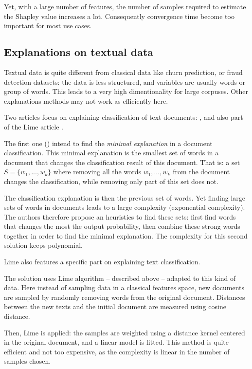 \documentclass[a4paper,11pt]{kth-mag}
\begin{document}
Yet, with a large number of features, the number of samples required to estimate the Shapley value increases a lot. Consequently convergence time become too important for most use cases.

\subsection{Explanations on textual data}

Textual data is quite different from classical data like churn prediction, or fraud detection datasets: the data is less structured, and variables are usually words or group of words. This leads to a very high dimentionality for large corpuses. Other explanations methods may not work as efficiently here.

Two articles focus on explaining classification of text documents:  \cite{documentclassif}, and also part of the Lime article \cite{lime}.

The first one (\cite{documentclassif}) intend to find the \textit{minimal explanation} in a document classification. This minimal explanation is the smallest set of words in a document that changes the classification result of this document. That is: a set $S = \{w_1, ..., w_k\}$ where removing all the words $w_1, ..., w_k$ from the document changes the classification, while removing only part of this set does not.

The classification explanation is then the previous set of words. Yet finding large sets of words in documents leads to a large complexity (exponential complexity). The authors therefore propose an heuristics to find these sets: first find words that changes the most the output probability, then combine these strong words together in order to find the minimal explanation. The complexity for this second solution keeps polynomial.

\vspace{\baselineskip}

Lime \cite{lime} also features a specific part on explaining text classification.

The solution uses Lime algorithm -- described above -- adapted to this kind of data. Here instead of sampling data in a classical features space, new documents are sampled by randomly removing words from the original document. Distances between the new texts and the initial document are measured using cosine distance.

Then, Lime is applied: the samples are weighted using a distance kernel centered in the original document, and a linear model is fitted. This method is quite efficient and not too expensive, as the complexity is linear in the number of samples chosen.
\end{document}
